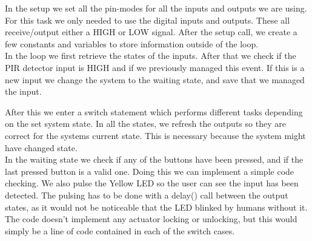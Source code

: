 In the setup we set all the pin-modes for all the inputs and outputs we are using. For this task we only needed to use the digital inputs and outputs. These all receive/output either a HIGH or LOW signal. After the setup call, we create a few constants and variables to store information outside of the loop.\\

In the loop we first retrieve the states of the inputs. After that we check if the PIR detector input is HIGH and if we previously managed this event. If this is a new input we change the system to the waiting state, and save that we managed the input. 

After this we enter a switch statement which performs different tasks depending on the set system state. In all the states, we refresh the outputs so they are correct for the systems current state. This is necessary because the system might have changed state. \\

In the waiting state we check if any of the buttons have been pressed, and if the last pressed button is a valid one. Doing this we can implement a simple code checking. We also pulse the Yellow LED so the user can see the input has been detected. The pulsing has to be done with a delay() call between the output states, as it would not be noticeable that the LED blinked by humans without it.\\

The code doesn't implement any actuator locking or unlocking, but this would simply be a line of code contained in each of the  switch cases. 